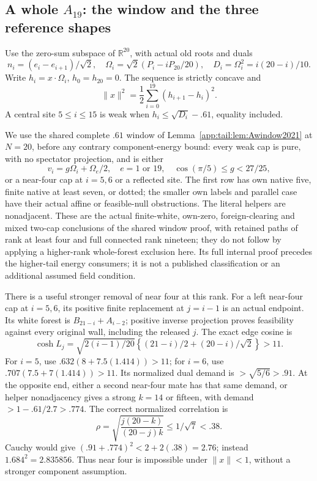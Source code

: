 \documentclass[11pt]{article}
\theoremstyle{definition}
\theoremstyle{remark}
\begin{document}
\subsection[A whole A19: the window and the three reference shapes]{A whole \(A_{19}\): the window and the three reference shapes}
\label{app:exact19:Awindow}

Use the zero-sum subspace of
\(\mathbb R^{20}\), with actual old roots
and duals
\[
 n_i=(e_i-e_{i+1})/\sqrt2,\quad
 \Omega_i=\sqrt2(P_i-iP_{20}/20),\quad
 D_i=\Omega_i^2=i(20-i)/10 .
\]
Write \(h_i=x\cdot\Omega_i\), \(h_0=h_{20}=0\).
The sequence is strictly concave and
\[
                 \|x\|^2=\frac12\sum_{i=0}^{19}(h_{i+1}-h_i)^2 .
\]
A central site \(5\le i\le15\) is weak
when \(h_i\le\sqrt{D_i}-.61\), equality
included.

We use the shared complete \(.61\) window
of Lemma~\ref{app:tail:lem:Awindow2021}
at \(N=20\), before any contrary
component-energy bound: every weak cap
is pure, with no spectator projection,
and is either
\[
 v_i=g\Omega_i+\Omega_e/2,\quad e=1\text{ or }19,
 \quad \cos(\pi/5)\le g<27/25 ,
\]
or a near-four cap at \(i=5,6\) or
a reflected site.
The first row has own native five,
finite native at least seven, or dotted;
the smaller own labels and parallel case
have their actual affine or feasible-null
obstructions.
The literal helpers are nonadjacent.
These are the actual finite-white,
own-zero, foreign-clearing and mixed
two-cap conclusions of the shared
window proof, with retained paths of
rank at least four and full connected
rank nineteen; they do not follow by
applying a higher-rank whole-forest
exclusion here.
Its full internal proof precedes
the higher-tail energy consumers;
it is not a published classification
or an additional assumed field condition.

There is a useful stronger removal of
near four at this rank.
For a left near-four cap at \(i=5,6\),
its positive finite replacement at
\(j=i-1\) is an actual endpoint.
Its white forest is
\(B_{21-i}+A_{i-2}\); positive inverse
projection proves feasibility against
every original wall, including the
released \(j\).
The exact edge cosine is
\[
 \cosh L_j=\sqrt{2(i-1)/20}
                 \left\{(21-i)/2+(20-i)/\sqrt2\right\}>11 .
\]
For \(i=5\), use
\(.632(8+7.5(1.414))>11\);
for \(i=6\), use
\(.707(7.5+7(1.414))>11\).
Its normalized dual demand is
\(>\sqrt{5/6}>.91\).
At the opposite end, either a second
near-four mate has that same demand,
or helper nonadjacency gives a strong
\(k=14\) or fifteen, with demand
\(>1-.61/2.7>.774\).
The correct normalized correlation is
\[
 \rho=\sqrt{\frac{j(20-k)}{(20-j)k}}
                       \le1/\sqrt7<.38 .
\]
Cauchy would give
\((.91+.774)^2<2+2(.38)=2.76\);
instead \(1.684^2=2.835856\).
Thus near four is impossible under
\(\|x\|<1\), without a stronger
component assumption.
\end{document}
